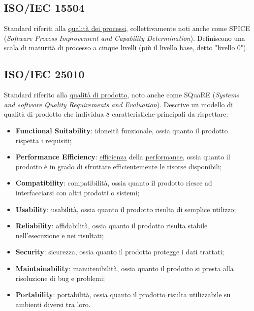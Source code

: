 	\subsection{ISO/IEC 15504}
	\label{sec:iso15504}
	Standard riferiti alla \underline{\hyperref[sec:qualitaprocessi]{qualità dei processi}}, collettivamente noti anche come SPICE (\emph{Software Process Improvement and Capability Determination}). Definiscono una scala di maturità di processo a cinque livelli (più il livello base, detto "livello 0").


	\subsection{ISO/IEC 25010}
	\label{sec:iso25010d}
	Standard riferito alla \underline{\hyperref[sec:qualitaprodotto]{qualità di prodotto}}, noto anche come SQuaRE (\emph{Systems and software Quality Requirements and Evaluation}). Descrive un modello di qualità di prodotto che individua 8 caratteristiche principali da rispettare: \begin{itemize}
	\item \textbf{Functional Suitability}: idoneità funzionale, ossia quanto il prodotto rispetta i requisiti;
	\item \textbf{Performance Efficiency}: \underline{\hyperref[sec:efficienza]{efficienza}} della \underline{\hyperref[sec:performance]{performance}}, ossia quanto il prodotto è in grado di sfruttare efficientemente le risorse disponibili;
	\item \textbf{Compatibility}: compatibilità, ossia quanto il prodotto riesce ad interfacciarsi con altri prodotti o sistemi;
	\item \textbf{Usability}: usabilità, ossia quanto il prodotto risulta di semplice utilizzo;
	\item \textbf{Reliability}: affidabilità, ossia quanto il prodotto risulta stabile nell'esecuzione e nei risultati;
	\item \textbf{Security}: sicurezza, ossia quanto il prodotto protegge i dati trattati;
	\item \textbf{Maintainability}: manutenibilità, ossia quanto il prodotto si presta alla risoluzione di bug e problemi;
	\item \textbf{Portability}: portabilità, ossia quanto il prodotto risulta utilizzabile su ambienti diversi tra loro.
	\end{itemize}


